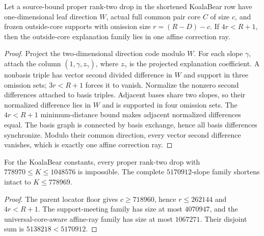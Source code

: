 
\begin{theorem}
Let a source-bound proper rank-two drop in the shortened KoalaBear row have
one-dimensional leaf direction $W$, actual full common pair core $C$ of size
$c$, and frozen outside-core supports with omission size $r=(R-D)-c$. If
$4r<R+1$, then the outside-core explanation family lies in one affine
correction ray.
\end{theorem}

\begin{proof}
Project the two-dimensional direction code modulo $W$. For each slope
$\gamma$, attach the column $(1,\gamma,z_\gamma)$, where $z_\gamma$ is the
projected explanation coefficient. A nonbasis triple has vector second
divided difference in $W$ and support in three omission sets; $3r<R+1$
forces it to vanish. Normalize the nonzero second differences attached to
basis triples. Adjacent bases share two slopes, so their normalized
difference lies in $W$ and is supported in four omission sets. The
$4r<R+1$ minimum-distance bound makes adjacent normalized differences equal.
The basis graph is connected by basis exchange, hence all basis differences
synchronize. Modulo their common direction, every vector second difference
vanishes, which is exactly one affine correction ray.
\end{proof}

\begin{corollary}
For the KoalaBear constants, every proper rank-two drop with
$778970\le K\le1048576$ is impossible. The complete $5170912$-slope family
shortens intact to $K\le778969$.
\end{corollary}

\begin{proof}
The parent locator floor gives $c\ge718960$, hence $r\le262144$ and
$4r<R+1$. The support-meeting family has size at most $4070947$, and the
universal-core-aware affine-ray family has size at most $1067271$. Their
disjoint sum is $5138218<5170912$.
\end{proof}
